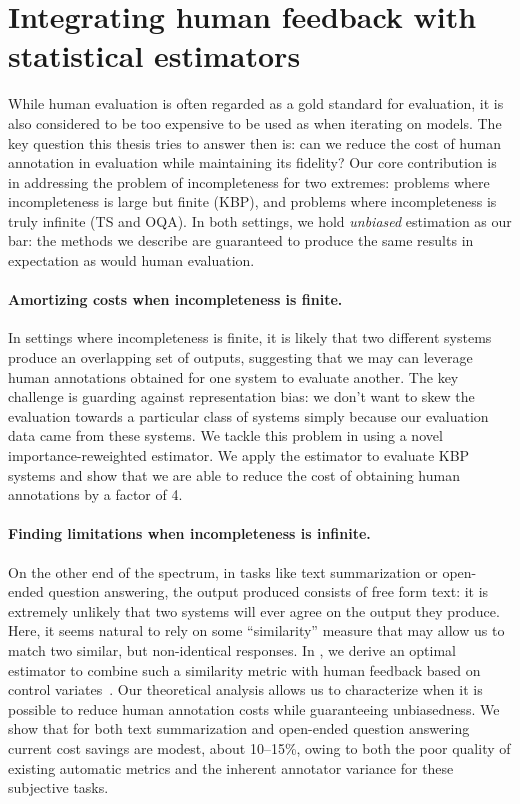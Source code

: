 \section{Integrating human feedback with statistical estimators}
While human evaluation is often regarded as a gold standard for evaluation, it is also considered to be too expensive to be used as when iterating on models.
The key question this thesis tries to answer then is: can we reduce the cost of human annotation in evaluation while maintaining its fidelity?
Our core contribution is in addressing the problem of incompleteness for two extremes: problems where incompleteness is large but finite (KBP), and problems where incompleteness is truly infinite (TS and OQA).
In both settings, we hold \textit{unbiased} estimation as our bar: the methods we describe are guaranteed to produce the same results in expectation as would human evaluation.

\paragraph{Amortizing costs when incompleteness is finite.}
In settings where incompleteness is finite, it is likely that two different systems produce an overlapping set of outputs, suggesting that we may can leverage human annotations obtained for one system to evaluate another.
The key challenge is guarding against representation bias: we don't want to skew the evaluation towards a particular class of systems simply because our evaluation data came from these systems.
We tackle this problem in  using a novel importance-reweighted estimator. We apply the estimator to evaluate KBP systems and show that we are able to reduce the cost of obtaining human annotations by a factor of 4.

\paragraph{Finding limitations when incompleteness is infinite.}
On the other end of the spectrum, in tasks like text summarization or open-ended question answering, the output produced consists of free form text: it  is extremely unlikely that two systems will ever agree on the output they produce.
Here, it seems natural to rely on some ``similarity'' measure that may allow us to match two similar, but non-identical responses.
In , we derive an optimal estimator to combine such a similarity metric with human feedback based on control variates~\citep{owen2013monte}.
Our theoretical analysis allows us to characterize when it is possible to reduce human annotation costs while guaranteeing unbiasedness.
We show that for both text summarization and open-ended question answering current cost savings are modest, about 10--15\%, owing to both the poor quality of existing automatic metrics and the inherent annotator variance for these subjective tasks.


